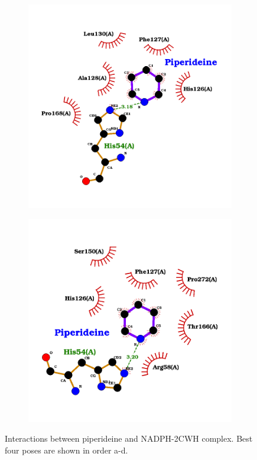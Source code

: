 \documentclass[12pt]{article}
\begin{document}
\begin{figure}[h!]
\begin{subfigure}[h!]{0.35\textwidth}
			\caption{}
		\end{subfigure}
		\hfill
		\begin{subfigure}[h!]{0.35\textwidth}
			\hspace{2cm}
			\includegraphics[width=\textwidth]{../10/Dock/Dock2/best3.png}
			\caption{}
		\end{subfigure}
		\hfill
		\begin{subfigure}[h!]{0.35\textwidth}
			\hspace{-2cm}
			\includegraphics[width=\textwidth]{../10/Dock/Dock2/best4.png}
			\caption{}
		\end{subfigure}
		\hfill
		\caption[Interactions between piperideine and NADPH-2CWH complex.]{\centering Interactions between piperideine and NADPH-2CWH complex. Best four poses are shown in order a-d.}
		\label{fig10_3}
	\end{figure}
\end{document}

